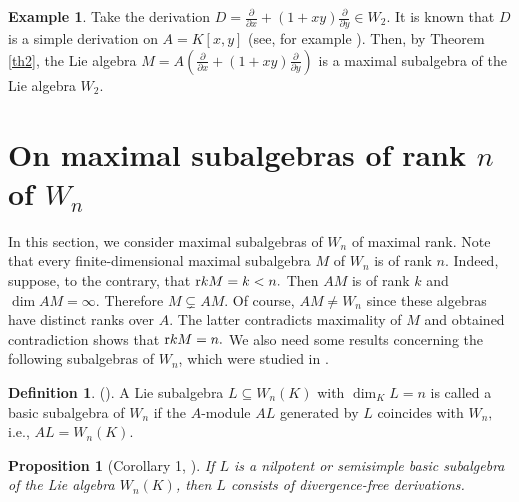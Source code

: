 \documentclass[12pt,a4paper]{amsart}
\theoremstyle{plain}
\newtheorem{proposition}{Proposition}
\theoremstyle{definition}
\newtheorem{definition}{Definition}
\newtheorem{example}{Example}
\begin{document}
{	\begin{example}
		Take the derivation $D=\frac{\partial}{\partial x}+ (1+xy)\frac{\partial}{\partial y}\in W_2.$ It is known that $D$ is a simple derivation on $A=K[x, y]$ (see, for example \cite{Now}). Then, by Theorem \ref{th2}, the Lie algebra $M=A(\frac{\partial}{\partial x}+(1+xy)\frac{\partial}{\partial y}) $ is a maximal subalgebra of the Lie algebra $W_2.$
		
	\end{example}
	
	
	\section{On  maximal subalgebras of rank $n$ of $W_n$}
	In this section,  we consider maximal subalgebras of $W_n$ of maximal rank. 
	Note that every finite-dimensional maximal subalgebra $M$  of $W_n$ is of rank $n.$ Indeed,  suppose, to the contrary, that $\textrm rk M=k<n.$ Then $AM$ is of rank $k$ and $\dim AM=\infty .$ Therefore $M\subsetneq AM$. Of course, $AM\not = W_n$ since these algebras have distinct ranks over $A.$ The latter contradicts maximality of $M$ and obtained contradiction shows that $ \textrm rk M=n.$ 
	We also  need   some results concerning the following  subalgebras of $W_n$, which were  studied	in \cite{Makedonskyi}.
	\begin{definition} (\cite{Makedonskyi}).
		A Lie subalgebra $L \subseteq W_n({K})$ with $\dim_K L = n$ is called a basic subalgebra of $W_n$  if the $A$-module $AL$ generated by $L$ coincides with $W_n,$ i.e.,  $AL=W_n(K).$
	\end{definition}
	
	\begin{proposition}[Corollary 1, \cite{Makedonskyi}] \label{prop:div_free}
		If $L$ is a nilpotent or semisimple basic subalgebra of the Lie algebra  $W_n(K)$, then $L$ consists of divergence-free derivations.
	\end{proposition}
	
}
\end{document}
